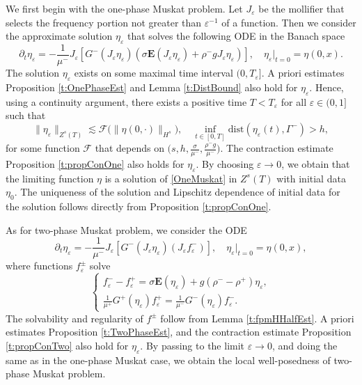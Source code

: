 \documentclass[12pt]{amsart}
\theoremstyle{definition}
\numberwithin{equation}{section}
\newcommand{\p}{\partial}
\newcommand{\f}{\frac}
\begin{document}
We first begin with the one-phase Muskat problem.
Let $J_\varepsilon$ be the mollifier that selects the frequency portion not greater than $\varepsilon^{-1}$ of a function.
Then we consider the approximate solution $\eta_\varepsilon$ that solves the  following ODE in the Banach space 
\begin{equation*}
    \p_t \eta_\varepsilon = -\f{1}{\mu^-} J_\varepsilon [G^-(J_\varepsilon \eta_\varepsilon)(\sigma \mathbf{E}(J_\varepsilon\eta_\varepsilon)+ \rho^-gJ_\varepsilon\eta_\varepsilon)], \quad  \eta_\varepsilon|_{t = 0} = \eta(0, x).
\end{equation*}
The solution $\eta_\varepsilon$ exists on some maximal time interval $(0, T_\varepsilon]$. 
A priori estimates Proposition \ref{t:OnePhaseEst} and Lemma \ref{t:DistBound} also hold for $\eta_\varepsilon$.
Hence, using a continuity argument, there exists a positive time $T<T_\varepsilon$ for all $\varepsilon \in (0,1]$ such that
\begin{equation*}
  \| \eta_\varepsilon\|_{Z^s(T)} \lesssim \mathcal{F}\big(\|\eta(0,\cdot)\|_{H^s}\big), \quad  \inf_{t\in[0,T]} \text{dist}(\eta_\varepsilon(t), \Gamma^{-}) >h,
\end{equation*}
for some function $\mathcal{F}$ that depends on $\big(s,h, \frac{\sigma}{\mu^-},  \frac{\rho^- g}{ \mu^-}\big)$.
The contraction estimate Proposition \ref{t:propConOne} also holds for $\eta_\varepsilon$.
By choosing $\varepsilon \rightarrow 0$, we obtain that the limiting function $\eta$ is a solution of \eqref{OneMuskat} in $Z^s(T)$ with initial data $\eta_0$.
The uniqueness of the solution and Lipschitz dependence of initial data for the solution follows directly from Proposition \ref{t:propConOne}.

As for two-phase Muskat problem, we consider the ODE
\begin{equation*}
    \p_t \eta_\varepsilon = -\f{1}{\mu^-} J_\varepsilon [G^-(J_\varepsilon \eta_\varepsilon)(J_\varepsilon f_\varepsilon^-)], \quad  \eta_\varepsilon|_{t = 0} = \eta(0, x),
\end{equation*}
where functions $f^\pm_\varepsilon$ solve
\begin{equation*}  
\begin{cases}
f^-_\varepsilon - f^+_\varepsilon = \sigma \mathbf{E}(\eta_\varepsilon) + g(\rho^- - \rho^+)\eta_\varepsilon, \\
\frac{1}{\mu^+}G^+(\eta_\varepsilon)f^+_\varepsilon = \frac{1}{\mu^-}G^-(\eta_\varepsilon)f^-_\varepsilon.
\end{cases}
\end{equation*}
The solvability and regularity of $f^\pm$ follow from Lemma \ref{t:fpmHHalfEst}.
A priori estimates Proposition \ref{t:TwoPhaseEst}, and the contraction estimate Proposition \ref{t:propConTwo} also hold for $\eta_\varepsilon$.
By passing to the limit $\varepsilon \rightarrow 0$, and doing the same as in the one-phase Muskat case, we obtain the local well-posedness of two-phase Muskat problem.
\end{document}
